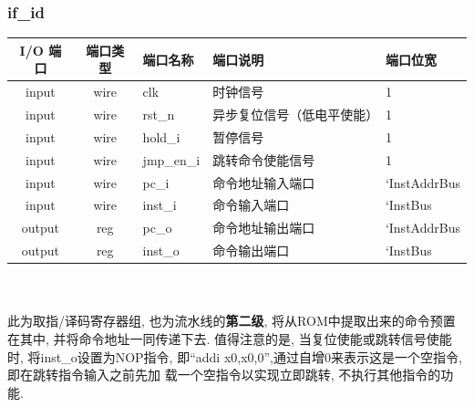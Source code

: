 \documentclass[lang=cn,11pt,a4paper,chinesefont=founder]{elegantpaper}
\begin{document}
\subsubsection{if\_id}
\begin{tabular}{cclll}
    \toprule
    I/O 端口 & 端口类型 & 端口名称   & 端口说明                   & 端口位宽     \\
    \midrule
    input    & wire     & clk        & 时钟信号                   & 1            \\
    input    & wire     & rst\_n     & 异步复位信号（低电平使能） & 1            \\
    input    & wire     & hold\_i    & 暂停信号                   & 1            \\
    input    & wire     & jmp\_en\_i & 跳转命令使能信号           & 1            \\
    input    & wire     & pc\_i      & 命令地址输入端口           & `InstAddrBus \\
    input    & wire     & inst\_i    & 命令输入端口               & `InstBus     \\
    output   & reg      & pc\_o      & 命令地址输出端口           & `InstAddrBus \\
    output   & reg      & inst\_o    & 命令输出端口               & `InstBus     \\
    \bottomrule
\end{tabular}\\
\\
此为取指/译码寄存器组, 也为流水线的\textbf{第二级}, 将从ROM中提取出来的命令预置在其中, 
并将命令地址一同传递下去. 值得注意的是, 当复位使能或跳转信号使能时, 将inst\_o设置为NOP指令, 
即“addi x0,x0,0”,通过自增0来表示这是一个空指令, 即在跳转指令输入之前先加
载一个空指令以实现立即跳转, 不执行其他指令的功能. 
\end{document}
